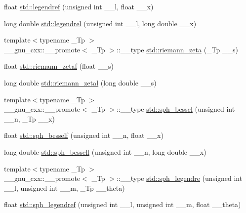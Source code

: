 \begin{DoxyCompactItemize}
\item 
float \hyperlink{group__tr29124__math__spec__func_gaed94e3c664c99f5204da75be75aeac21}{std\+::legendref} (unsigned int \+\_\+\+\_\+l, float \+\_\+\+\_\+x)
\item 
long double \hyperlink{group__tr29124__math__spec__func_ga1b39bc22e3cc4860d08eb54099460391}{std\+::legendrel} (unsigned int \+\_\+\+\_\+l, long double \+\_\+\+\_\+x)
\item 
{\footnotesize template$<$typename \+\_\+\+Tp $>$ }\\\+\_\+\+\_\+gnu\+\_\+cxx\+::\+\_\+\+\_\+promote$<$ \+\_\+\+Tp $>$\+::\+\_\+\+\_\+type \hyperlink{group__tr29124__math__spec__func_ga67a6bfed9b6ab692e8c798b674431424}{std\+::riemann\+\_\+zeta} (\+\_\+\+Tp \+\_\+\+\_\+s)
\item 
float \hyperlink{group__tr29124__math__spec__func_gaf92063315061a56d3e2c4053156d968e}{std\+::riemann\+\_\+zetaf} (float \+\_\+\+\_\+s)
\item 
long double \hyperlink{group__tr29124__math__spec__func_ga1e92da3b878d75270f38d3ec9b513086}{std\+::riemann\+\_\+zetal} (long double \+\_\+\+\_\+s)
\item 
{\footnotesize template$<$typename \+\_\+\+Tp $>$ }\\\+\_\+\+\_\+gnu\+\_\+cxx\+::\+\_\+\+\_\+promote$<$ \+\_\+\+Tp $>$\+::\+\_\+\+\_\+type \hyperlink{group__tr29124__math__spec__func_ga478e517ed975bcb256de230e64f0fda5}{std\+::sph\+\_\+bessel} (unsigned int \+\_\+\+\_\+n, \+\_\+\+Tp \+\_\+\+\_\+x)
\item 
float \hyperlink{group__tr29124__math__spec__func_ga534e36e1dcefad8daec98920db16eec4}{std\+::sph\+\_\+besself} (unsigned int \+\_\+\+\_\+n, float \+\_\+\+\_\+x)
\item 
long double \hyperlink{group__tr29124__math__spec__func_ga11d72b1af81ce9da3c878a25087ee927}{std\+::sph\+\_\+bessell} (unsigned int \+\_\+\+\_\+n, long double \+\_\+\+\_\+x)
\item 
{\footnotesize template$<$typename \+\_\+\+Tp $>$ }\\\+\_\+\+\_\+gnu\+\_\+cxx\+::\+\_\+\+\_\+promote$<$ \+\_\+\+Tp $>$\+::\+\_\+\+\_\+type \hyperlink{group__tr29124__math__spec__func_ga573842c12247b87746b548f1945755a8}{std\+::sph\+\_\+legendre} (unsigned int \+\_\+\+\_\+l, unsigned int \+\_\+\+\_\+m, \+\_\+\+Tp \+\_\+\+\_\+theta)
\item 
float \hyperlink{group__tr29124__math__spec__func_gaae635d28c06a3be2679901b382090852}{std\+::sph\+\_\+legendref} (unsigned int \+\_\+\+\_\+l, unsigned int \+\_\+\+\_\+m, float \+\_\+\+\_\+theta)

\end{DoxyCompactItemize}
